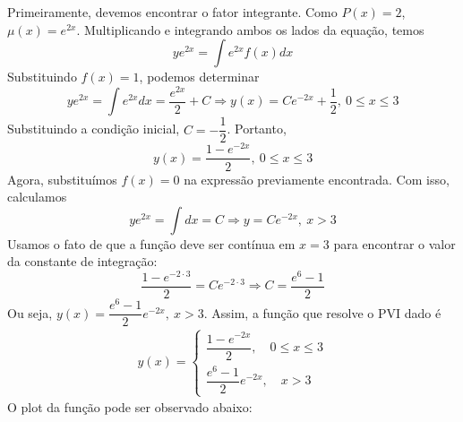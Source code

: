 \documentclass[oneside,12pt,a4paper]{report}
\begin{document}
    \begin{resolucao}
        Primeiramente, devemos encontrar o fator integrante. Como $P(x)=2$, $\mu(x)=e^{2x}$. Multiplicando e integrando ambos os lados da equação, temos
        \[ye^{2x}=\int e^{2x}f(x)dx\]
        Substituindo $f(x)=1$, podemos determinar
        \[ye^{2x}=\int e^{2x}dx=\frac{e^{2x}}{2}+C\Rightarrow y(x)=Ce^{-2x}+\frac{1}{2},~0\leq x\leq3\]
        Substituindo a condição inicial, $C=-\dfrac{1}{2}$. Portanto,
        \[y(x)=\frac{1-e^{-2x}}{2},~0\leq x\leq3\]
        Agora, substituímos $f(x)=0$ na expressão previamente encontrada. Com isso, calculamos
        \[ye^{2x}=\int dx=C\Rightarrow y=Ce^{-2x},~x>3\]
        Usamos o fato de que a função deve ser contínua em $x=3$ para encontrar o valor da constante de integração:
        \[\frac{1-e^{-2\cdot3}}{2}=Ce^{-2\cdot3}\Rightarrow C=\frac{e^6-1}{2}\]
        Ou seja, $y(x)=\dfrac{e^6-1}{2}e^{-2x},~x>3$. Assim, a função que resolve o PVI dado é
        \begin{gather*}
            \boxed{
            y(x)=\begin{cases}
                \dfrac{1-e^{-2x}}{2},\quad0\leq x\leq3\\
                \dfrac{e^6-1}{2}e^{-2x},\quad x>3
            \end{cases}
            }
        \end{gather*}
        O plot da função pode ser observado abaixo:
        \begin{figure}[H]
            \centering
        \end{figure}
    \end{resolucao}
\end{document}
